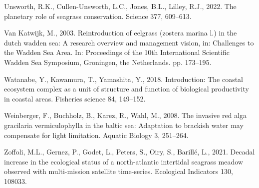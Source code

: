 \documentclass[
  letterpaper,
  DIV=11,
  numbers=noendperiod]{scrartcl}
\newlength{\cslhangindent}
\newenvironment{CSLReferences}[2] %
 {\begin{list}{}{%
  \setlength{\itemindent}{0pt}
  \setlength{\leftmargin}{0pt}
  \setlength{\parsep}{0pt}
  \ifodd #1
   \setlength{\leftmargin}{\cslhangindent}
   \setlength{\itemindent}{-1\cslhangindent}
  \fi
  \setlength{\itemsep}{#2\baselineskip}}}
 {\end{list}}
\begin{document}
\begin{CSLReferences}{1}{0}
Unsworth, R.K., Cullen-Unsworth, L.C., Jones, B.L., Lilley, R.J., 2022.
The planetary role of seagrass conservation. Science 377, 609--613.

Van Katwijk, M., 2003. Reintroduction of eelgrass (zostera marina l.) in
the dutch wadden sea: A research overview and management vision, in:
Challenges to the Wadden Sea Area. In: Proceedings of the 10th
International Scientific Wadden Sea Symposium, Groningen, the
Netherlands. pp. 173--195.

Watanabe, Y., Kawamura, T., Yamashita, Y., 2018. Introduction: The
coastal ecosystem complex as a unit of structure and function of
biological productivity in coastal areas. Fisheries science 84,
149--152.

Weinberger, F., Buchholz, B., Karez, R., Wahl, M., 2008. The invasive
red alga gracilaria vermiculophylla in the baltic sea: Adaptation to
brackish water may compensate for light limitation. Aquatic Biology 3,
251--264.

Zoffoli, M.L., Gernez, P., Godet, L., Peters, S., Oiry, S., Barillé, L.,
2021. Decadal increase in the ecological status of a north-atlantic
intertidal seagrass meadow observed with multi-mission satellite
time-series. Ecological Indicators 130, 108033.

\end{CSLReferences}
\end{document}
